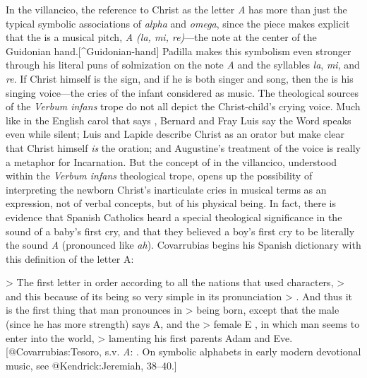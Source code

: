 In the villancico, the reference to Christ as the letter \emph{A} has more than just
the typical symbolic associations of \emph{alpha} and \emph{omega}, since the piece makes
explicit that the  is a musical pitch, \emph{A (la, mi, re)}---the note at the
center of the Guidonian hand.[^Guidonian-hand]
Padilla makes this symbolism even stronger through his literal puns of
solmization on the note \emph{A} and the syllables \emph{la}, \emph{mi}, and \emph{re}.
If Christ himself is the sign, and if he is both singer and song, then the  is his singing voice---the cries of the infant considered as music.
The theological sources of the \emph{Verbum infans} trope do not all depict the
Christ-child's crying voice.
Much like in the English carol that says , Bernard and Fray Luis say the Word speaks even while silent; Luis
and Lapide describe Christ as an orator but make clear that Christ himself \emph{is}
the oration; and Augustine's treatment of the voice is really a metaphor for
Incarnation.
But the concept of  in the villancico, understood within the
\emph{Verbum infans} theological trope, opens up the possibility of interpreting the
newborn Christ's inarticulate cries in musical terms as an expression, not of
verbal concepts, but of his physical being.
In fact, there is evidence that Spanish Catholics heard a special theological
significance in the sound of a baby's first cry, and that they believed a boy's
first cry to be literally the sound \emph{A} (pronounced like \emph{ah}).
Covarrubias begins his Spanish dictionary with this definition of the letter A:

> The first letter in order according to all the nations that used characters,
> \Dots{} and this because of its being so very simple in its pronunciation
> . \Dots{} And thus it is the first thing that man pronounces in
> being born, except that the male (since he has more strength) says A, and the
> female E , in which man seems to enter into the world,
> lamenting his first parents Adam and Eve.
[@Covarrubias:Tesoro, s.v. \emph{A}:
. 
On symbolic alphabets in early modern devotional music, see @Kendrick:Jeremiah,
38--40.]

